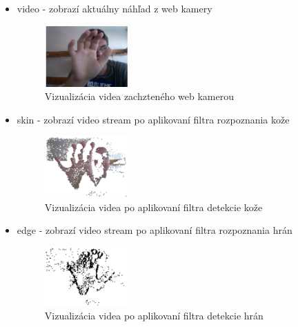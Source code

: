 \begin{itemize}
  \item video - zobrazí aktuálny náhľad z web kamery

\begin{figure}[H]
  \centering
  \includegraphics[width=0.3\textwidth]{img/motion/video.png}
  \caption[Vizualizácia videa zachzteného web kamerou]{
    Vizualizácia videa zachzteného web kamerou}
  \label{fig: motion-video}
\end{figure}

  \item skin - zobrazí video stream po aplikovaní filtra rozpoznania kože

\begin{figure}[H]
  \centering
  \includegraphics[width=0.3\textwidth]{img/motion/skin.png}
  \caption[Vizualizácia videa po aplikovaní filtra detekcie kože]{
    Vizualizácia videa po aplikovaní filtra detekcie kože}
  \label{fig: motion-skin}
\end{figure}

  \item edge - zobrazí video stream po aplikovaní filtra rozpoznania hrán

\begin{figure}[H]
  \centering
  \includegraphics[width=0.3\textwidth]{img/motion/edges.png}
  \caption[Vizualizácia videa po aplikovaní filtra detekcie hrán]{
    Vizualizácia videa po aplikovaní filtra detekcie hrán}
  \label{fig: motion-edges}
\end{figure}

\end{itemize}


